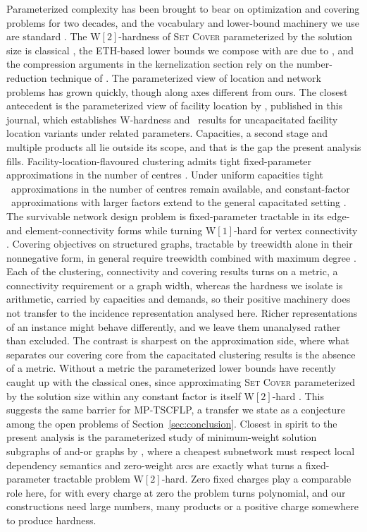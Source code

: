 Parameterized complexity has been brought to bear on optimization and
covering problems for two decades, and the vocabulary and lower-bound
machinery we use are standard \citep{DowneyFellows2013,Cygan2015}. The
$\mathrm{W}[2]$-hardness of \textsc{Set Cover} parameterized by the
solution size is classical \citep{DowneyFellows2013}, the ETH-based lower
bounds we compose with are due to \citet{ChenHuangKanjXia2006}, and the
compression arguments in the kernelization section rely on
the number-reduction technique of \citet{FrankTardos1987}. The parameterized
view of location and network problems has grown quickly, though along axes
different from ours. The closest antecedent is the parameterized view of
facility location by \citet{FellowsFernau2011}, published in this
journal, which establishes W-hardness and \FPT\ results for
uncapacitated facility location variants under related parameters.
Capacities, a second stage and multiple products all lie outside its
scope, and that is the gap the present analysis fills.
Facility-location-flavoured clustering admits tight
fixed-parameter approximations in the number of centres
\citep{CohenAddadEtAl2019}. Under uniform capacities tight \FPT\
approximations in the number of centres remain available, and
constant-factor \FPT\ approximations with larger factors extend to the
general capacitated setting \citep{CohenAddadLi2019}. The survivable
network design problem is fixed-parameter tractable in its edge- and
element-connectivity forms while turning $\mathrm{W}[1]$-hard for vertex
connectivity \citep{FeldmannMukherjeevanLeeuwen2025}. Covering objectives
on structured graphs, tractable by treewidth alone in their nonnegative
form, in general require treewidth combined with maximum degree
\citep{FominRamamoorthi2022}. Each of the clustering, connectivity and
covering results turns on a metric, a connectivity
requirement or a graph width, whereas the hardness we isolate is arithmetic,
carried by capacities and demands, so their positive machinery does not
transfer to the incidence representation analysed here. Richer
representations of an instance might behave differently, and we leave
them unanalysed rather than excluded. The contrast is sharpest on the
approximation side, where what separates our covering core from the
capacitated clustering results is the absence of a metric. Without a
metric the parameterized lower bounds have
recently caught up with the classical ones, since approximating
\textsc{Set Cover} parameterized by the solution size within any constant
factor is itself $\mathrm{W}[2]$-hard \citep{LinRenSunWang2023}. This suggests the same barrier for
MP-TSCFLP, a transfer we state as a conjecture among the open problems
of Section~\ref{sec:conclusion}. Closest in
spirit to the present analysis is the parameterized study of
minimum-weight solution subgraphs of and-or graphs by
\citet{DantasProttiSouza2013}, where a cheapest subnetwork must respect
local dependency semantics and zero-weight arcs are exactly what turns a
fixed-parameter tractable problem $\mathrm{W}[2]$-hard. Zero fixed charges play a comparable role here, for with every
charge at zero the problem turns polynomial, and our constructions
need large numbers, many products or a positive charge somewhere to
produce hardness.

